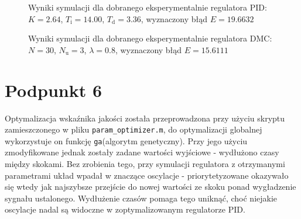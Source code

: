 \begin{figure}[ht]
\centering
{}
\caption{Wyniki symulacji dla dobranego eksperymentalnie regulatora PID: \\$K = \num{2,64}$, $T_{\mathrm{i}}=\num{14,00}$, $T_{\mathrm{d}}=\num{3,36}$, wyznaczony błąd $E=\num{19,6632}$}
\label{Z5manualPID}
\end{figure}


\begin{figure}[ht]
\centering
{}
\caption{Wyniki symulacji dla dobranego eksperymentalnie regulatora DMC: \\$N=30$, $N_{\mathrm{u}}=3$, $\lambda=\num{0,8}$, wyznaczony błąd $E=\num{15,6111}$}
\label{Z5manualDMC}
\end{figure}

\chapter{Podpunkt 6}
Optymalizacja wskaźnika jakości została przeprowadzona przy użyciu skryptu zamieszczonego w pliku \verb+param_optimizer.m+, do optymalizacji globalnej wykorzystuje on funkcję \verb+ga+(algorytm genetyczny). Przy jego użyciu zmodyfikowane jednak zostały zadane wartości wyjściowe - wydłużono czasy między skokami. Bez zrobienia tego, przy symulacji regulatora z otrzymanymi parametrami układ wpadał w znaczące oscylacje - priorytetyzowane okazywało się wtedy jak najszybsze przejście do nowej wartości ze skoku ponad wygładzenie sygnału ustalonego. Wydłużenie czasów pomaga tego uniknąć, choć niejakie oscylacje nadal są widoczne w zoptymalizowanym regulatorze PID.

